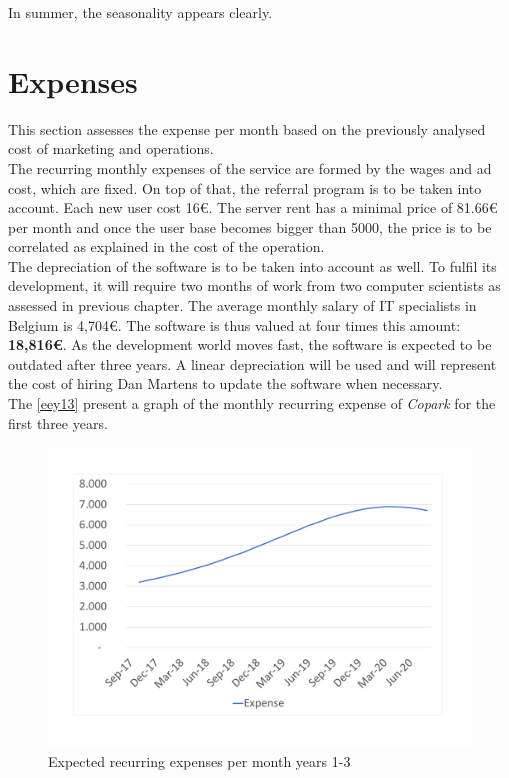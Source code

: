 \documentclass[12pt,a4paper,oneside]{book}
\newcommand{\bp}{\textit{Copark}}
\begin{document}
In summer, the seasonality appears clearly.

\section{Expenses}
\label{expenses}
This section assesses the expense per month based on the previously analysed cost of marketing and operations.\\

The recurring monthly expenses of the service are formed by the wages and ad cost, which are fixed. On top of that, the referral program is to be taken into account. Each new user cost 16\euro{}. The server rent has a minimal price of 81.66\euro{} per month and once the user base becomes bigger than 5000, the price is to be correlated as explained in the cost of the operation.\\


The depreciation of the software is to be taken into account as well. To fulfil its development, it will require two months of work from two computer scientists as assessed in previous chapter. The average monthly salary of IT specialists in Belgium is 4,704\euro{}.\cite{avslinf} The software is thus valued at four times this amount: \textbf{18,816\euro{}}. As the development world moves fast, the software is expected to be outdated after three years. A linear depreciation will be used and will represent the cost of hiring Dan Martens to update the software when necessary.\\


The \autoref{eey13} present a graph of the monthly recurring expense of \bp{} for the first three years.

\begin{figure}[h]
\centering
\caption{Expected recurring expenses per month years 1-3}
\label{eey13}
\includegraphics[keepaspectratio=true,width=\textwidth-2cm]{../graph/expectedexp.pdf}
\end{figure}
\end{document}

